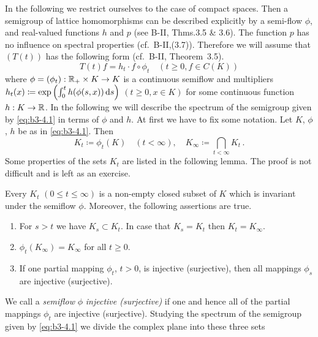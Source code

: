 In the following we restrict ourselves to the case of compact spaces. 
Then a semigroup of lattice homomorphisms can be described explicitly by a semi-flow $\phi$, and real-valued functions $h$ and $p$ (see B-II, Thms.3.5 \& 3.6). The function $p$ has no influence on spectral properties (cf.\ B-II,(3.7)). 
Therefore we will assume that $(T(t))$ has the following form (cf.\ B-II, Theorem~3.5). 
\begin{equation}\label{eq:b3-4.1}
	T(t)f = h_{t}\cdot f\circ\phi_{t} \quad (t \geq 0, f \in C(K)) 
\end{equation}
where $\phi = (\phi_{t}): \mathbb{R}_{+} \times K \to K$ is a continuous semiflow and multipliers $h_{t}(x) \coloneq \exp\left(\int_{0}^{t} h(\phi(s,x)) \mathop{}\!\mathrm{d}{s}\right)$ $(t \geq 0, x \in K)$ for some continuous function $h : K \to \mathbb{R}$.
In the following we will describe the spectrum of the semigroup given by \eqref{eq:b3-4.1} in terms of $\phi$ and $h$.
At first we have to fix some notation.
Let $K$, $\phi$, $h$ be as in \eqref{eq:b3-4.1}. 
Then
\begin{equation}\label{eq:b3-4.2}
K_{t} \coloneq \phi_{t}(K) \quad (t < \infty), \quad K_{\infty} \coloneq \bigcap_{t < \infty} K_{t}\,.
\end{equation}
Some properties of the sets $K_t$  are listed in the following lemma.
The proof is not difficult and is left as an exercise. 
\begin{lemma}\label{lem:b3-4.2}
%
	Every $K_{t}$ $(0 \leq t \leq \infty)$ is a non-empty closed subset of $K$ which is invariant under the semiflow $\phi$.
	Moreover, the following assertions are true.
	\begin{enumerate}[\upshape (i)]
		\item 
		For $s > t$ we have $K_{s} \subset K_{t}$.
		In case that $K_{s} = K_{t}$ then $K_{t} = K_{\infty}$.
		
		\item
		$\phi_{t}(K_{\infty}) = K_{\infty}$ for all $t \geq 0$.
		
		\item 
		If one partial mapping $\phi_{t}$, $t > 0$, is injective (surjective), then all mappings $\phi_{s}$ are injective (surjective).
	\end{enumerate}
\end{lemma}
We call a \emph{semiflow} $\phi$ \emph{injective (surjective)} if one and hence all of the partial mappings $\phi_{t}$ are injective (surjective).
Studying the spectrum of the semigroup given by \eqref{eq:b3-4.1} we divide the complex plane into these three sets

